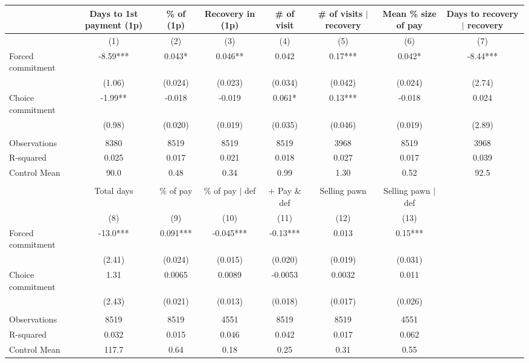 \begin{tabular}{lccccccc}
\toprule
      & Days to 1st payment (1p) & \% of (1p) & Recovery in (1p) & \# of visit & \# of visits $|$ recovery & Mean \% size of pay & Days to recovery $|$ recovery \\
\midrule
\midrule
      & (1)   & (2)   & (3)   & (4)   & (5)   & (6)   & (7) \\
\midrule
\midrule
Forced commitment & -8.59*** & 0.043* & 0.046** & 0.042 & 0.17*** & 0.042* & -8.44*** \\
      & (1.06) & (0.024) & (0.023) & (0.034) & (0.042) & (0.024) & (2.74) \\
Choice commitment & -1.99** & -0.018 & -0.019 & 0.061* & 0.13*** & -0.018 & 0.024 \\
      & (0.98) & (0.020) & (0.019) & (0.035) & (0.046) & (0.019) & (2.89) \\
      &       &       &       &       &       &       &  \\
\midrule
Observations & 8380  & 8519  & 8519  & 8519  & 3968  & 8519  & 3968 \\
R-squared & 0.025 & 0.017 & 0.021 & 0.018 & 0.027 & 0.017 & 0.039 \\
Control Mean & 90.0  & 0.48  & 0.34  & 0.99  & 1.30  & 0.52  & 92.5 \\
\midrule
\midrule
      &       &       &       &       &       &       &  \\
\midrule
      & Total days & \% of pay & \% of pay $|$ def  & + Pay \& def & Selling pawn & Selling pawn $|$ def &  \\
\midrule
\midrule
      & (8)   & (9)   & (10)  & (11)  & (12)  & (13)  &  \\
\midrule
\midrule
Forced commitment & -13.0*** & 0.091*** & -0.045*** & -0.13*** & 0.013 & 0.15*** &  \\
      & (2.41) & (0.024) & (0.015) & (0.020) & (0.019) & (0.031) &  \\
Choice commitment & 1.31  & 0.0065 & 0.0089 & -0.0053 & 0.0032 & 0.011 &  \\
      & (2.43) & (0.021) & (0.013) & (0.018) & (0.017) & (0.026) &  \\
      &       &       &       &       &       &       &  \\
\midrule
Observations & 8519  & 8519  & 4551  & 8519  & 8519  & 4551  &  \\
R-squared & 0.032 & 0.015 & 0.046 & 0.042 & 0.017 & 0.062 &  \\
Control Mean & 117.7 & 0.64  & 0.18  & 0.25  & 0.31  & 0.55  &  \\
\bottomrule
\bottomrule
\end{tabular}%
